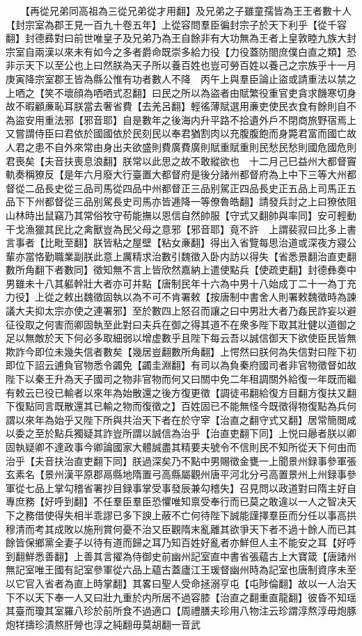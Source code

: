 　　【再從兄弟同高祖為三從兄弟從才用翻】及兄弟之子雖童孺皆為王王者數十人【封宗室為郡王見一百九十卷五年】上從容問羣臣徧封宗子於天下利乎【從千容翻】封德彞對曰前世唯皇子及兄弟乃為王自餘非有大功無為王者上皇敦睦九族大封宗室自兩漢以來未有如今之多者爵命既崇多給力役【力役蓋防閤庶僕白直之類】恐非示天下以至公也上曰然朕為天子所以養百姓也豈可勞百姓以養己之宗族乎十一月庚寅降宗室郡王皆為縣公惟有功者數人不降　丙午上與羣臣論止盜或請重法以禁之上哂之【笑不壞顔為哂哂式忍翻】曰民之所以為盜者由賦繁役重官吏貪求饑寒切身故不暇顧亷恥耳朕當去奢省費【去羌呂翻】輕徭薄賦選用亷吏使民衣食有餘則自不為盜安用重法邪【邪音耶】自是數年之後海内升平路不拾遺外戶不閉商旅野宿焉上又嘗謂侍臣曰君依於國國依於民刻民以奉君猶割肉以充腹腹飽而身斃君富而國亡故人君之患不自外來常由身出夫欲盛則費廣費廣則賦重賦重則民愁民愁則國危國危則君喪矣【夫音扶喪息浪翻】朕常以此思之故不敢縱欲也　十二月己巳益州大都督竇軌奏稱獠反【是年六月廢大行臺置大都督府是後分諸州都督府為上中下三等大州都督從二品長史從三品司馬從四品中州都督正三品别駕正四品長史正五品上司馬正五品下下州都督從三品别駕長史司馬亦皆逓降一等僚魯皓翻】請發兵討之上曰獠依阻山林時出鼠竊乃其常俗牧守苟能撫以恩信自然帥服【守式又翻帥與率同】安可輕動干戈漁獵其民比之禽獸豈為民父母之意邪【邪音耶】竟不許　上謂裴寂曰比多上書言事者【比毗至翻】朕皆粘之屋壁【粘女亷翻】得出入省覽每思治道或深夜方寢公輩亦當恪勤職業副朕此意上厲精求治數引魏徵入卧内訪以得失【省悉景翻治直吏翻數所角翻下者數同】徵知無不言上皆欣然嘉納上遣使點兵【使疏吏翻】封德彝奏中男雖未十八其軀幹壯大者亦可并點【唐制民年十六為中男十八始成丁二十一為丁充力役】上從之敕出魏徵固執以為不可不肯署敕【按唐制中書舍人則署敕魏徵時為諫議大夫抑太宗亦使之連署邪】至於數四上怒召而讓之曰中男壯大者乃姦民詐妄以避征役取之何害而卿固執至此對曰夫兵在御之得其道不在衆多陛下取其壯健以道御之足以無敵於天下何必多取細弱以增虚數乎且陛下每云吾以誠信御天下欲使臣民皆無欺詐今即位未幾失信者數矣【幾居豈翻數所角翻】上愕然曰朕何為失信對曰陛下初即位下詔云逋負官物悉令蠲免【蠲圭淵翻】有司以為負秦府國司者非官物徵督如故陛下以秦王升為天子國司之物非官物而何又曰關中免二年租調關外給復一年既而繼有敕云已役已輸者以來年為始散還之後方復更徵【調徒弔翻給復方目翻方復扶又翻下復點同言既散還其已輸之物而復徵之】百姓固已不能無怪今既徵得物復點為兵何謂以來年為始乎又陛下所與共治天下者在於守宰【治直之翻守式又翻】居常簡閲咸以委之至於點兵獨疑其詐豈所謂以誠信為治乎【治直吏翻下同】上悦曰曏者朕以卿固執疑卿不達政事今卿論國家大體誠盡其精要夫號令不信則民不知所從天下何由而治乎【夫音扶治直吏翻下同】朕過深矣乃不點中男賜徵金甕一上聞景州録事參軍張玄素名【景州漢平原郡鬲縣地隋置弓高縣屬觀州唐平河北分弓高置景州上州録事參軍從七品上掌勾稽省署抄目録事掌受事發辰兼勾稽失】召見問以政道對曰隋主好自專庶務【好呼到翻】不任羣臣羣臣恐懼唯知禀受奉行而已莫之敢違以一人之智决天下之務借使得失相半乖謬已多下諛上蔽不亡何待陛下誠能謹擇羣臣而分任以事高拱穆清而考其成敗以施刑賞何憂不治又臣觀隋末亂離其欲爭天下者不過十餘人而已其餘皆保鄉黨全妻子以待有道而歸之耳乃知百姓好亂者亦鮮但人主不能安之耳【好呼到翻鮮悉善翻】上善其言擢為侍御史前幽州記室直中書省張藴古上大寶箴【唐諸州無記室唯王國有記室參軍從六品上藴古蓋廬江王瑗督幽州時為記室也唐制資序未至以它官入省者為直上時掌翻】其畧曰聖人受命拯溺亨屯【屯陟倫翻】故以一人治天下不以天下奉一人又曰壯九重於内所居不過容膝【治直之翻重直龍翻】彼昏不知瑶其臺而瓊其室羅八珍於前所食不過適口【周禮膳夫珍用八物注云珍謂淳熬淳毋炮豚炮䍧擣珍漬熬肝膋也淳之純翻毋莫胡翻一音武